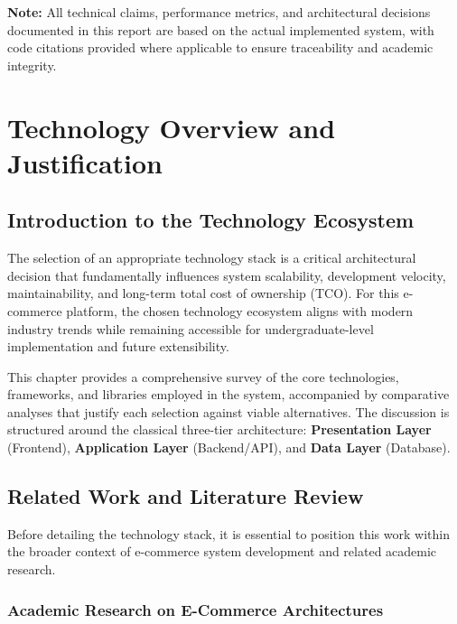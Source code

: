 \documentclass[12pt, a4paper]{report}
\begin{document}
\vspace{1cm}
\noindent \textbf{Note:} All technical claims, performance metrics, and architectural decisions documented in this report are based on the actual implemented system, with code citations provided where applicable to ensure traceability and academic integrity.


\chapter{Technology Overview and Justification}

\section{Introduction to the Technology Ecosystem}

The selection of an appropriate technology stack is a critical architectural decision that fundamentally influences system scalability, development velocity, maintainability, and long-term total cost of ownership (TCO). For this e-commerce platform, the chosen technology ecosystem aligns with modern industry trends while remaining accessible for undergraduate-level implementation and future extensibility.

This chapter provides a comprehensive survey of the core technologies, frameworks, and libraries employed in the system, accompanied by comparative analyses that justify each selection against viable alternatives. The discussion is structured around the classical three-tier architecture: \textbf{Presentation Layer} (Frontend), \textbf{Application Layer} (Backend/API), and \textbf{Data Layer} (Database).

\section{Related Work and Literature Review}

Before detailing the technology stack, it is essential to position this work within the broader context of e-commerce system development and related academic research.

\subsection{Academic Research on E-Commerce Architectures}
\end{document}
